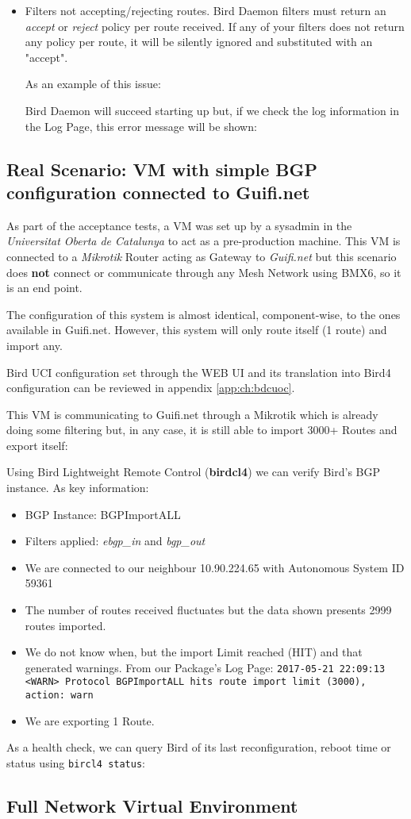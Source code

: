 \begin{itemize}
\item Filters not accepting/rejecting routes.
Bird Daemon filters must return an \textit{accept} or \textit{reject} policy per route received. If any of your filters does not return any policy per route, it will be silently ignored and substituted with an "accept".

As an example of this issue:


Bird Daemon will succeed starting up but, if we check the log information in the Log Page, this error message will be shown:


\end{itemize}

\subsection{Real Scenario: VM with simple BGP configuration connected to Guifi.net}
As part of the acceptance tests, a VM was set up by a sysadmin in the \textit{Universitat Oberta de Catalunya} to act as a pre-production machine. This VM is connected to a \textit{Mikrotik} Router acting as Gateway to \textit{Guifi.net} but this scenario does \textbf{not} connect or communicate through any Mesh Network using BMX6, so it is an end point.

The configuration of this system is almost identical, component-wise, to the ones available in Guifi.net. However, this system will only route itself (1 route) and import any.

Bird UCI configuration set through the WEB UI and its translation into Bird4 configuration can be reviewed in appendix \ref{app:ch:bdcuoc}.

This VM is communicating to Guifi.net through a Mikrotik which is already doing some filtering but, in any case, it is still able to import 3000+ Routes and export itself:



Using Bird Lightweight Remote Control (\textbf{birdcl4}) we can verify Bird's BGP instance. As key information:

\begin{itemize}
    \item BGP Instance: BGPImportALL
    \item Filters applied: \textit{ebgp\_in} and \textit{bgp\_out}
    \item We are connected to our neighbour 10.90.224.65 with Autonomous System ID 59361
    \item  The number of routes received fluctuates but the data shown presents 2999 routes imported.
    \item We do not know when, but the import Limit reached (HIT) and that generated warnings.
    From our Package's Log Page:
    \texttt{2017-05-21 22:09:13 <WARN> Protocol BGPImportALL hits route import limit (3000), action: warn}
    \item We are exporting 1 Route.
\end{itemize}

As a health check, we can query Bird of its last reconfiguration, reboot time or status using \texttt{bircl4 status}:



\subsection{Full Network Virtual Environment}
